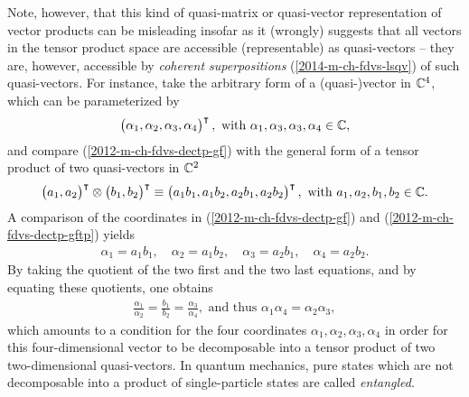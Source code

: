 Note, however, that this kind of quasi-matrix or quasi-vector representation of vector products
can be misleading insofar as
it (wrongly) suggests that all vectors in the tensor product space are accessible (representable) as quasi-vectors
-- they are, however, accessible by {\em coherent superpositions} (\ref{2014-m-ch-fdvs-lsqv})
of such quasi-vectors. \label{2012-m-c-fdvs-entanglement}
For instance, take the arbitrary form of a (quasi-)vector in ${\Bbb C}^4$, which can be parameterized by
\begin{equation}
\begin{pmatrix}\alpha_1,\alpha_2,\alpha_3,\alpha_4\end{pmatrix}^\intercal , \textrm{ with } \alpha_1,\alpha_3,\alpha_3,\alpha_4 \in {\Bbb C},
\label{2012-m-ch-fdvs-dectp-gf}
\end{equation}
and compare (\ref{2012-m-ch-fdvs-dectp-gf}) with the general form of a tensor product of two quasi-vectors in  ${\Bbb C}^2$
\begin{equation}
\begin{pmatrix}a_1,a_2\end{pmatrix}^\intercal \otimes \begin{pmatrix}b_1,b_2\end{pmatrix}^\intercal
\equiv \begin{pmatrix}a_1b_1, a_1 b_2,a_2b_1,a_2b_2\end{pmatrix}^\intercal , \textrm{ with } a_1,a_2,b_1,b_2\in {\Bbb C}.
\label{2012-m-ch-fdvs-dectp-gftp}
\end{equation}
A comparison of the coordinates in
(\ref{2012-m-ch-fdvs-dectp-gf})
and
(\ref{2012-m-ch-fdvs-dectp-gftp})
yields
\begin{equation}
\begin{split}
\alpha_1=a_1b_1,\quad
\alpha_2=a_1b_2,\quad
\alpha_3=a_2b_1,\quad
\alpha_4=a_2b_2.
\end{split}
\label{2012-m-ch-fdvs-dectp-gftp-a}
\end{equation}
By taking the quotient of the two first and the two last equations, and by equating these quotients, one obtains
\begin{equation}
\begin{split}
\frac{\alpha_1}{\alpha_2}=\frac{b_1}{b_2}
=\frac{\alpha_3}{\alpha_4},\textrm{ and thus }
{\alpha_1}{\alpha_4}={\alpha_2}{\alpha_3},
\end{split}
\label{2012-m-ch-fdvs-dectp-gftp-fr}
\end{equation}
which amounts to a condition for the four coordinates  $\alpha_1,\alpha_2,\alpha_3,\alpha_4$
in order for this four-dimensional vector to be decomposable into a tensor product of two two-dimensional quasi-vectors.
In quantum mechanics, pure states which are not decomposable into a  product of single-particle states
are called {\em entangled}.


